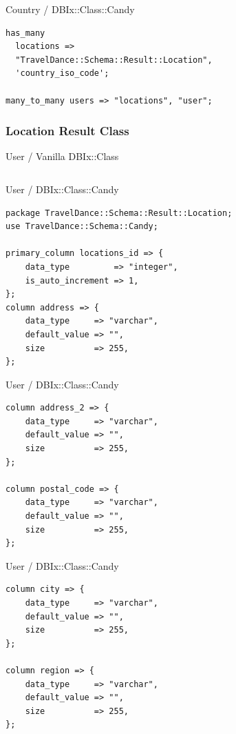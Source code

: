 \begin{frame}[fragile]{Country / DBIx::Class::Candy}
\begin{lstlisting}
has_many
  locations =>
  "TravelDance::Schema::Result::Location",
  'country_iso_code';

many_to_many users => "locations", "user";
\end{lstlisting}
\end{frame}

\subsubsection{Location Result Class}

\begin{frame}[fragile]{User / Vanilla DBIx::Class}
\begin{lstlisting}

\end{lstlisting}
\end{frame}

\begin{frame}[fragile]{User / DBIx::Class::Candy}
\begin{lstlisting}
package TravelDance::Schema::Result::Location;
use TravelDance::Schema::Candy;

primary_column locations_id => {
    data_type         => "integer",
    is_auto_increment => 1,
};
column address => {
    data_type     => "varchar",
    default_value => "",
    size          => 255,
};
\end{lstlisting}
\end{frame}

\begin{frame}[fragile]{User / DBIx::Class::Candy}
\begin{lstlisting}
column address_2 => {
    data_type     => "varchar",
    default_value => "",
    size          => 255,
};

column postal_code => {
    data_type     => "varchar",
    default_value => "",
    size          => 255,
};
\end{lstlisting}
\end{frame}

\begin{frame}[fragile]{User / DBIx::Class::Candy}
\begin{lstlisting}
column city => {
    data_type     => "varchar",
    default_value => "",
    size          => 255,
};

column region => {
    data_type     => "varchar",
    default_value => "",
    size          => 255,
};
\end{lstlisting}
\end{frame}

